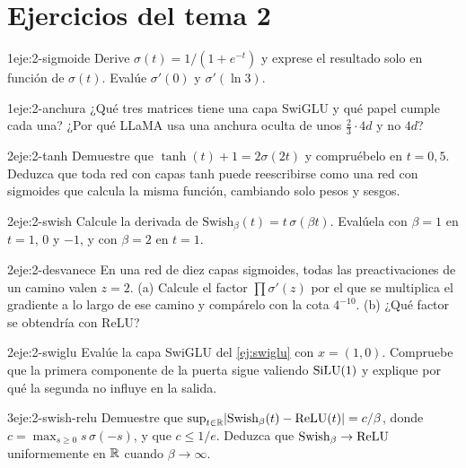 \section*{Ejercicios del tema 2}

\begin{ejercicio}{1}{eje:2-sigmoide}
Derive $\sigma(t)=1/(1+e^{-t})$ y exprese el resultado solo en función de $\sigma(t)$. Evalúe $\sigma'(0)$ y $\sigma'(\ln 3)$.
\end{ejercicio}

\begin{ejercicio}{1}{eje:2-anchura}
¿Qué tres matrices tiene una capa SwiGLU y qué papel cumple cada una? ¿Por qué LLaMA usa una anchura oculta de unos $\tfrac23\cdot 4d$ y no $4d$?
\end{ejercicio}

\begin{ejercicio}{2}{eje:2-tanh}
Demuestre que $\tanh(t)+1=2\sigma(2t)$ y compruébelo en $t=0{,}5$. Deduzca que toda red con capas tanh puede reescribirse como una red con sigmoides que calcula la misma función, cambiando solo pesos y sesgos.
\end{ejercicio}

\begin{ejercicio}{2}{eje:2-swish}
Calcule la derivada de $\mathrm{Swish}_\beta(t)=t\,\sigma(\beta t)$. Evalúela con $\beta=1$ en $t=1$, $0$ y $-1$, y con $\beta=2$ en $t=1$.
\end{ejercicio}

\begin{ejercicio}{2}{eje:2-desvanece}
En una red de diez capas sigmoides, todas las preactivaciones de un camino valen $z=2$. (a) Calcule el factor $\prod\sigma'(z)$ por el que se multiplica el gradiente a lo largo de ese camino y compárelo con la cota $4^{-10}$. (b) ¿Qué factor se obtendría con ReLU?
\end{ejercicio}

\begin{ejercicio}{2}{eje:2-swiglu}
Evalúe la capa SwiGLU del \cref{ej:swiglu} con $x=(1,0)$. Compruebe que la primera componente de la puerta sigue valiendo $\operatorname{SiLU}(1)$ y explique por qué la segunda no influye en la salida.
\end{ejercicio}

\begin{ejercicio}{3}{eje:2-swish-relu}
Demuestre que $\sup_{t\in\mathbb{R}}\lvert\mathrm{Swish}_\beta(t)-\operatorname{ReLU}(t)\rvert=c/\beta$, donde $c=\max_{s\ge 0}s\,\sigma(-s)$, y que $c\le 1/e$. Deduzca que $\mathrm{Swish}_\beta\to\operatorname{ReLU}$ uniformemente en $\mathbb{R}$ cuando $\beta\to\infty$.
\end{ejercicio}
